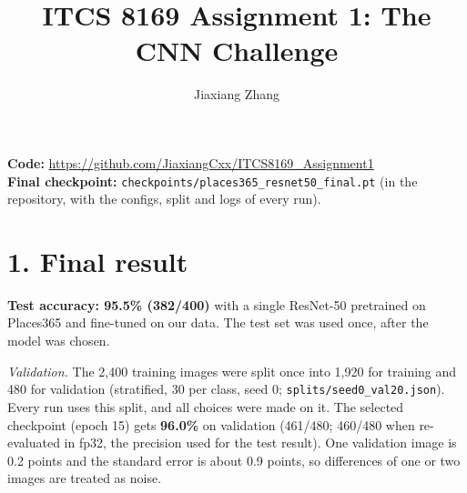 \documentclass[10pt]{article}
\title{\vspace{-1.8em}ITCS 8169 Assignment 1: The CNN Challenge}
\author{Jiaxiang Zhang}
\date{}
\begin{document}
\maketitle
\vspace{-2.9em}

\textbf{Code:} \url{https://github.com/JiaxiangCxx/ITCS8169_Assignment1}\\
\textbf{Final checkpoint:} \texttt{checkpoints/places365\_resnet50\_final.pt}
(in the repository, with the configs, split and logs of every run).

\section*{1. Final result}
\textbf{Test accuracy: 95.5\% (382/400)} with a single ResNet-50 pretrained on
Places365 and fine-tuned on our data. The test set was used once, after the
model was chosen.

\emph{Validation.} The 2,400 training images were split once into 1,920 for
training and 480 for validation (stratified, 30 per class, seed 0;
\texttt{splits/seed0\_val20.json}). Every run uses this split, and all choices
were made on it. The selected checkpoint (epoch 15) gets \textbf{96.0\%} on
validation (461/480; 460/480 when re-evaluated in fp32, the precision used for
the test result). One validation image is 0.2 points and the standard error
is about 0.9 points, so differences of one or two images are treated as noise.
\end{document}
